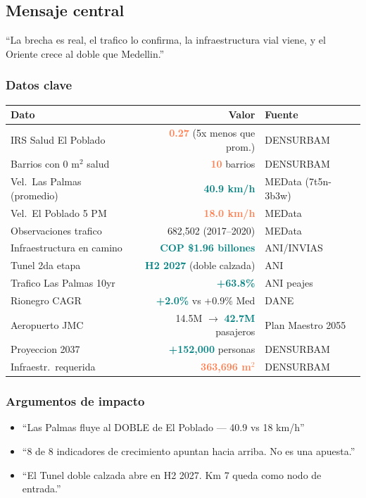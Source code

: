 \documentclass[11pt, a4paper]{article}
\newcommand{\hl}[1]{\textcolor{teal}{\textbf{#1}}}
\newcommand{\dg}[1]{\textcolor{coral}{\textbf{#1}}}
\begin{document}
\subsection{Mensaje central}

\begin{cita}
``La brecha es real, el trafico lo confirma, la infraestructura vial viene, y el Oriente crece al doble que Medellin.''
\end{cita}

\subsubsection{Datos clave}

\begin{tabular}{@{}l r l@{}}
\toprule
\textbf{Dato} & \textbf{Valor} & \textbf{Fuente} \\
\midrule
IRS Salud El Poblado & \dg{0.27} (5x menos que prom.) & DENSURBAM \\
Barrios con 0 m$^2$ salud & \dg{10} barrios & DENSURBAM \\
Vel.\ Las Palmas (promedio) & \hl{40.9 km/h} & MEData (7t5n-3b3w) \\
Vel.\ El Poblado 5 PM & \dg{18.0 km/h} & MEData \\
Observaciones trafico & 682,502 (2017--2020) & MEData \\
Infraestructura en camino & \hl{COP \$1.96 billones} & ANI/INVIAS \\
Tunel 2da etapa & \hl{H2 2027} (doble calzada) & ANI \\
Trafico Las Palmas 10yr & \hl{+63.8\%} & ANI peajes \\
Rionegro CAGR & \hl{+2.0\%} vs +0.9\% Med & DANE \\
Aeropuerto JMC & 14.5M $\to$ \hl{42.7M} pasajeros & Plan Maestro 2055 \\
Proyeccion 2037 & \hl{+152,000} personas & DENSURBAM \\
Infraestr.\ requerida & \dg{363,696 m$^2$} & DENSURBAM \\
\bottomrule
\end{tabular}

\subsubsection{Argumentos de impacto}
\begin{itemize}[nosep]
  \item ``Las Palmas fluye al DOBLE de El Poblado --- 40.9 vs 18 km/h''
  \item ``8 de 8 indicadores de crecimiento apuntan hacia arriba. No es una apuesta.''
  \item ``El Tunel doble calzada abre en H2 2027. Km 7 queda como nodo de entrada.''
\end{itemize}
\end{document}
